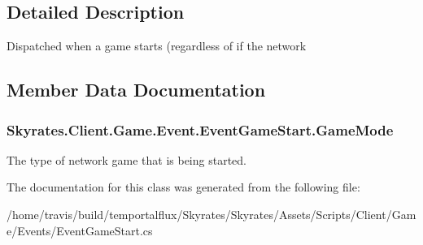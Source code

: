 \subsection{Detailed Description}
Dispatched when a game starts (regardless of if the network 



\subsection{Member Data Documentation}
\hypertarget{class_skyrates_1_1_client_1_1_game_1_1_event_1_1_event_game_start_ad45d0af9906a79fd939914ce8bcf8b57}{
\subsubsection[{Game\-Mode}]{ Skyrates.\-Client.\-Game.\-Event.\-Event\-Game\-Start.\-Game\-Mode}}\label{class_skyrates_1_1_client_1_1_game_1_1_event_1_1_event_game_start_ad45d0af9906a79fd939914ce8bcf8b57}


The type of network game that is being started. 



The documentation for this class was generated from the following file\-:\begin{DoxyCompactItemize}
\item 
/home/travis/build/temportalflux/\-Skyrates/\-Skyrates/\-Assets/\-Scripts/\-Client/\-Game/\-Events/Event\-Game\-Start.\-cs\end{DoxyCompactItemize}

